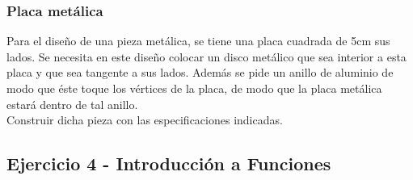 \documentclass[11pt, a4paper]{article}
\begin{document}

\newpage

\subsubsection*{ Placa met\'alica }
Para el dise\~no de una pieza met\'alica, se tiene una placa cuadrada de 5cm sus lados. Se necesita  en este dise\~no colocar un disco met\'alico que sea interior a esta placa y que sea tangente a sus lados. Adem\'as se pide un anillo de aluminio de modo que \'este toque los v\'ertices de la placa, de modo que la placa met\'alica estar\'a dentro de tal anillo. \\ 
Construir dicha pieza con las especificaciones indicadas. 


\subsection*{ Ejercicio 4 - Introducci\'on a Funciones }
\end{document}
